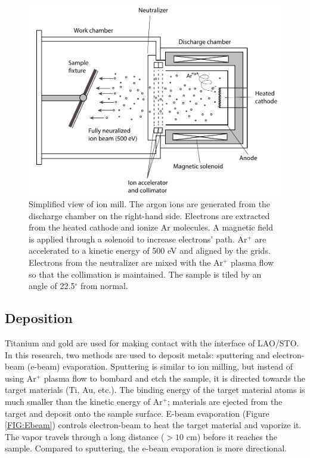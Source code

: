 \documentclass[pdflatex, sectionletters, 12pt, final, phd]{pittetd}    %
\begin{document}
\begin{figure}[hp]
	\centering
	\includegraphics[width=1.0\textwidth]{Drawing/IonMill.pdf}
	\caption[Simplified view of ion mill]{Simplified view of ion mill. The argon ions are generated from the discharge chamber on the right-hand side. Electrons are extracted from the heated cathode and ionize Ar molecules. A magnetic field is applied through a solenoid to increase electrons' path. Ar$^{+}$ are accelerated to a kinetic energy of 500 eV and aligned by the grids. Electrons from the neutralizer are mixed with the Ar$^{+}$ plasma flow so that the collimation is maintained. The sample is tiled by an angle of 22.5$^{\circ}$ from normal.}
	\label{FIG:IonMill}
\end{figure}

\subsection{Deposition}

Titanium and gold are used for making contact with the interface of LAO/STO. In this research, two methods are used to deposit metals: sputtering and electron-beam (e-beam) evaporation. Sputtering is similar to ion milling, but instead of using Ar$^{+}$ plasma flow to bombard and etch the sample, it is directed towards the target materials (Ti, Au, etc.). The binding energy of the target material atoms is much smaller than the kinetic energy of Ar$^{+}$; materials are ejected from the target and deposit onto the sample surface. E-beam evaporation (Figure \ref{FIG:Ebeam}) controls electron-beam to heat the target material and vaporize it. The vapor travels through a long distance ($> 10$ cm) before it reaches the sample. Compared to sputtering, the e-beam evaporation is more directional.
\end{document}
